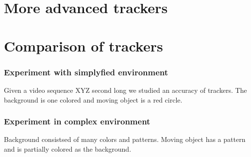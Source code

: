 
\section{More advanced trackers}


\section{Comparison of trackers}

\subsubsection{Experiment with simplyfied environment}

Given a video sequence XYZ second long we studied an accuracy of trackers. The background is one colored and moving object is a red circle.


\subsubsection{Experiment in complex environment}

Background consistsed of many colors and patterns. Moving object has a pattern and is partially colored as the background.

